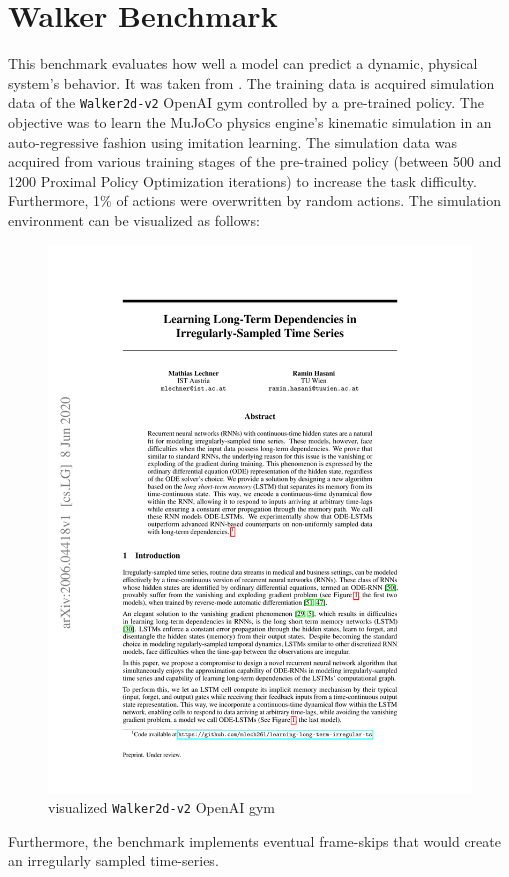 \documentclass[draft,final]{vutinfth} %
\begin{document}
\section{Walker Benchmark} \label{walker}
This benchmark evaluates how well a model can predict a dynamic, physical system's behavior. It was taken from \cite{ODELSTM}.
The training data is acquired simulation data of the \texttt{Walker2d-v2} OpenAI gym \cite{OpenAIGym} controlled by a pre-trained policy.
The objective was to learn the MuJoCo physics engine's kinematic simulation \cite{MuJoCo} in an auto-regressive fashion using imitation learning.
The simulation data was acquired from various training stages of the pre-trained policy (between 500 and 1200 Proximal Policy Optimization iterations) to increase the task difficulty. Furthermore, 1\% of actions were overwritten by random actions.
The simulation environment can be visualized as follows:
\begin{figure}[H]
\centering{}
\includegraphics[page=7,width=0.8\linewidth,trim={340 345 105 375},clip]{literature/learning_long_term_dependencies_in_irregularly_sampled_time_series.pdf}
\caption{visualized \texttt{Walker2d-v2} OpenAI gym \cite[p. 7]{ODELSTM}}
\label{fig:walker2d_vis}
\end{figure}
Furthermore, the benchmark implements eventual frame-skips that would create an irregularly sampled time-series.
\end{document}
